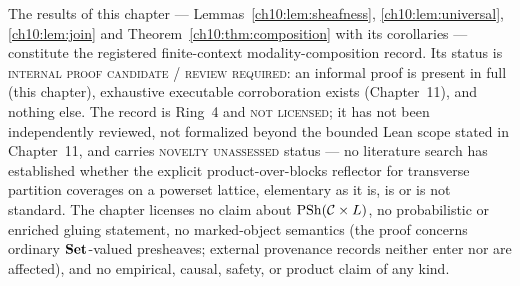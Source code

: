 \begin{boundary}
\label{ch10:bnd:recap}
The results of this chapter --- Lemmas~\ref{ch10:lem:sheafness},
\ref{ch10:lem:universal}, \ref{ch10:lem:join} and
Theorem~\ref{ch10:thm:composition} with its corollaries --- constitute the
registered finite-context modality-composition record. Its status is
\textsc{internal proof candidate / review required}: an informal proof is
present in full (this chapter), exhaustive executable corroboration exists
(Chapter~11), and nothing else. The record is Ring~4 and \textsc{not
licensed}; it has not been independently reviewed, not formalized beyond the
bounded Lean scope stated in Chapter~11, and carries
\textsc{novelty unassessed} status --- no literature search has established
whether the explicit product-over-blocks reflector for transverse partition
coverages on a powerset lattice, elementary as it is, is or is not standard.
The chapter licenses no claim about $\mathrm{PSh}(\mathcal{C} \times L)$, no probabilistic or
enriched gluing statement, no marked-object semantics (the proof concerns
ordinary $\mathbf{Set}$-valued presheaves; external provenance records neither enter
nor are affected), and no empirical, causal, safety, or product claim of any
kind.
\end{boundary}
